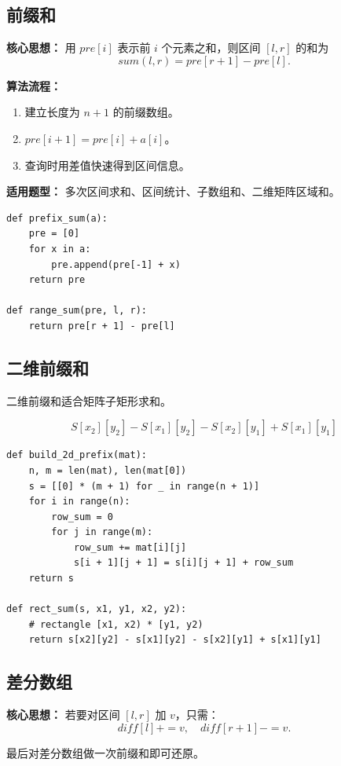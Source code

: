 \documentclass[UTF8,a4paper,14pt]{ctexart}
\begin{document}
\subsection{前缀和}

\textbf{核心思想：}
用 $pre[i]$ 表示前 $i$ 个元素之和，则区间 $[l,r]$ 的和为
\[
sum(l,r)=pre[r+1]-pre[l].
\]

\textbf{算法流程：}
\begin{enumerate}
  \item 建立长度为 $n+1$ 的前缀数组。
  \item $pre[i+1]=pre[i]+a[i]$。
  \item 查询时用差值快速得到区间信息。
\end{enumerate}

\textbf{适用题型：}
多次区间求和、区间统计、子数组和、二维矩阵区域和。

\begin{lstlisting}
def prefix_sum(a):
    pre = [0]
    for x in a:
        pre.append(pre[-1] + x)
    return pre

def range_sum(pre, l, r):
    return pre[r + 1] - pre[l]
\end{lstlisting}

\subsection{二维前缀和}

二维前缀和适合矩阵子矩形求和。

\[
S[x_2][y_2]-S[x_1][y_2]-S[x_2][y_1]+S[x_1][y_1]
\]

\begin{lstlisting}
def build_2d_prefix(mat):
    n, m = len(mat), len(mat[0])
    s = [[0] * (m + 1) for _ in range(n + 1)]
    for i in range(n):
        row_sum = 0
        for j in range(m):
            row_sum += mat[i][j]
            s[i + 1][j + 1] = s[i][j + 1] + row_sum
    return s

def rect_sum(s, x1, y1, x2, y2):
    # rectangle [x1, x2) * [y1, y2)
    return s[x2][y2] - s[x1][y2] - s[x2][y1] + s[x1][y1]
\end{lstlisting}

\subsection{差分数组}

\textbf{核心思想：}
若要对区间 $[l,r]$ 加 $v$，只需：
\[
diff[l]+=v,\quad diff[r+1]-=v.
\]

最后对差分数组做一次前缀和即可还原。
\end{document}
